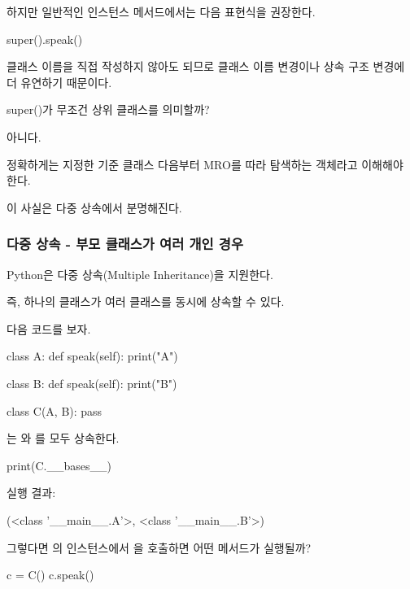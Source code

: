 하지만 일반적인 인스턴스 메서드에서는 다음 표현식을 권장한다.

\begin{dhkcode}
super().speak()
\end{dhkcode}

클래스 이름을 직접 작성하지 않아도 되므로 클래스 이름 변경이나 상속 구조 변경에 더 유연하기 때문이다.

\begin{dhknote}
\begin{dhksmry}[centered]
super()가 무조건 상위 클래스를 의미할까?
\end{dhksmry}
\end{dhknote}

아니다.

정확하게는 지정한 기준 클래스 다음부터 MRO를 따라 탐색하는 객체라고 이해해야 한다.

이 사실은 다중 상속에서 분명해진다.

\subsubsection{다중 상속 - 부모 클래스가 여러 개인 경우}

Python은 다중 상속(Multiple Inheritance)을 지원한다.

즉, 하나의 클래스가 여러 클래스를 동시에 상속할 수 있다.

다음 코드를 보자.

\begin{dhkcode}
class A:
    def speak(self):
        print("A")


class B:
    def speak(self):
        print("B")


class C(A, B):
    pass
\end{dhkcode}

는 와 를 모두 상속한다.

\begin{dhkcode}
print(C.__bases__)
\end{dhkcode}

실행 결과:

\begin{dhkzsh}
(<class '__main__.A'>, <class '__main__.B'>)
\end{dhkzsh}

그렇다면 의 인스턴스에서 을 호출하면 어떤 메서드가 실행될까?

\begin{dhkcode}
c = C()
c.speak()
\end{dhkcode}

